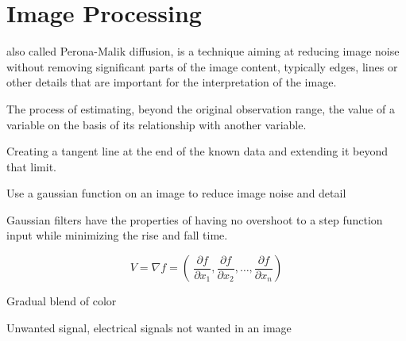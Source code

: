 \section{Image Processing}

\begin{definition}
    also called Perona-Malik diffusion, is a technique aiming at reducing image
    noise without removing significant parts of the image content, typically
    edges, lines or other details that are important for the interpretation of
    the image.

\end{definition}

\begin{definition}[extrapolation]
    The process of estimating, beyond the original observation range, the value
    of a variable on the basis of its relationship with another variable.

    Creating a tangent line at the end of the known data and extending it
    beyond that limit.

\end{definition}



\begin{definition}
    Use a gaussian function on an image to reduce image noise and detail
\end{definition}

\begin{definition}
    Gaussian filters have the properties of having no overshoot to a step
    function input while minimizing the rise and fall time.

\end{definition}


\begin{definition}
    $$
        V = \nabla{f} = \left(\
        \frac{\partial{f}}{\partial{x_{1}}},
        \frac{\partial{f}}{\partial{x_{2}}},
        \dots,
        \frac{\partial{f}}{\partial{x_{n}}}
    \right)
    $$
\end{definition}

\begin{definition}
    Gradual blend of color
\end{definition}

\begin{definition}
    Unwanted signal, electrical signals not wanted in an image
\end{definition}

